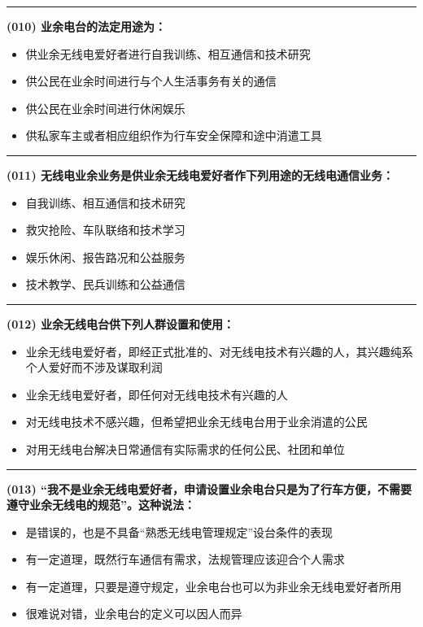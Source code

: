 \documentclass[twocolumn]{ctexart}  %
\begin{document}
\noindent\rule{0.5\textwidth}{1pt}
\heiti \textbf{(010) 业余电台的法定用途为：} \songti {\color{gray} [LK0008] }
\begin{itemize}
	\item  供业余无线电爱好者进行自我训练、相互通信和技术研究
	\item  供公民在业余时间进行与个人生活事务有关的通信
	\item  供公民在业余时间进行休闲娱乐
	\item  供私家车主或者相应组织作为行车安全保障和途中消遣工具
\end{itemize}


\noindent\rule{0.5\textwidth}{1pt}
\heiti \textbf{(011) 无线电业余业务是供业余无线电爱好者作下列用途的无线电通信业务：} \songti {\color{gray} [LK0111] }
\begin{itemize}
	\item  自我训练、相互通信和技术研究
	\item  救灾抢险、车队联络和技术学习
	\item  娱乐休闲、报告路况和公益服务
	\item  技术教学、民兵训练和公益通信
\end{itemize}


\noindent\rule{0.5\textwidth}{1pt}
\heiti \textbf{(012) 业余无线电台供下列人群设置和使用：} \songti {\color{gray} [LK0009] }
\begin{itemize}
	\item  业余无线电爱好者，即经正式批准的、对无线电技术有兴趣的人，其兴趣纯系个人爱好而不涉及谋取利润
	\item  业余无线电爱好者，即任何对无线电技术有兴趣的人
	\item  对无线电技术不感兴趣，但希望把业余无线电台用于业余消遣的公民
	\item  对用无线电台解决日常通信有实际需求的任何公民、社团和单位
\end{itemize}


\noindent\rule{0.5\textwidth}{1pt}
\heiti \textbf{(013) “我不是业余无线电爱好者，申请设置业余电台只是为了行车方便，不需要遵守业余无线电的规范”。这种说法：} \songti {\color{gray} [LK0051] }
\begin{itemize}
	\item  是错误的，也是不具备“熟悉无线电管理规定”设台条件的表现
	\item  有一定道理，既然行车通信有需求，法规管理应该迎合个人需求
	\item  有一定道理，只要是遵守规定，业余电台也可以为非业余无线电爱好者所用
	\item  很难说对错，业余电台的定义可以因人而异
\end{itemize}
\end{document}
